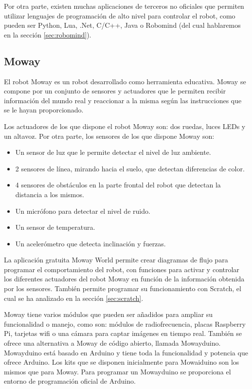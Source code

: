 Por otra parte, existen muchas aplicaciones de terceros no oficiales que permiten utilizar lenguajes de programación de alto nivel para controlar el robot, como pueden ser Python, Lua, .Net, C/C++, Java o Robomind (del cual hablaremos en la sección \ref{sec:robomind}).


\subsection{Moway}
\label{sec:moway}


El robot Moway\cite{moway} es un robot desarrollado como herramienta educativa. Moway se compone por un conjunto de sensores y actuadores que le permiten recibir información del mundo real y reaccionar a la misma según las instrucciones que se le hayan proporcionado.

Los actuadores de los que dispone el robot Moway son: dos ruedas, luces LEDs y un altavoz. Por otra parte, los sensores de los que dispone Moway son:
 
\begin{itemize}
	\item Un sensor de luz que le permite detectar el nivel de luz ambiente. 
	\item 2 sensores de línea, mirando hacia el suelo, que detectan diferencias de color.
	\item 4 sensores de obstáculos en la parte frontal del robot que detectan la distancia a los mismos.
	\item Un micrófono para detectar el nivel de ruido.
	\item Un sensor de temperatura. 
	\item Un acelerómetro que detecta inclinación y fuerzas.
\end{itemize}

La aplicación gratuita Moway World permite crear diagramas de flujo para programar el comportamiento del robot, con funciones para activar y controlar los diferentes actuadores del robot Moway en función de la información obtenida por los sensores. También permite programar su funcionamiento con Scratch, el cual se ha analizado en la sección \ref{sec:scratch}. 

Moway tiene varios módulos que pueden ser añadidos para ampliar su funcionalidad o manejo, como son: módulos de radiofrecuencia, placas Raspberry Pi, tarjetas wifi o una cámara para captar imágenes en tiempo real. También se ofrece una alternativa a Moway de código abierto, llamada Mowayduino. Mowayduino está basado en Arduino y tiene toda la funcionalidad y potencia que ofrece Arduino. Los kits que se disponen inicialmente para Mowaiduino son los mismos que para Moway. Para programar un Mowayduino se proporciona el entorno de programación oficial de Arduino.


